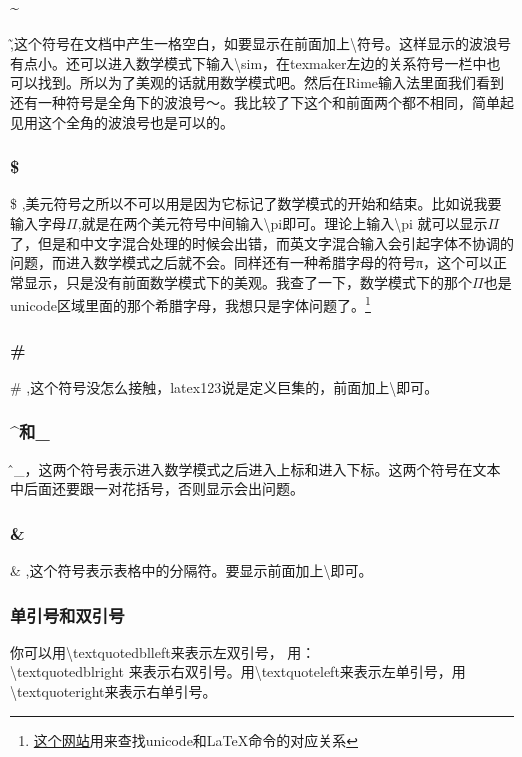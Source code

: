 \documentclass[11pt,oneside]{book}
\begin{document}
\begin{common-format}
\subsubsection{\~{}}
\~ ,这个符号在文档中产生一格空白，如要显示在前面加上\textbackslash 符号。这样显示的波浪号有点小。还可以进入数学模式下输入\textbackslash sim，在texmaker左边的关系符号一栏中也可以找到。所以为了美观的话就用数学模式吧。然后在Rime输入法里面我们看到还有一种符号是全角下的波浪号～。我比较了下这个和前面两个都不相同，简单起见用这个全角的波浪号也是可以的。

\subsubsection{\$}
\$ ,美元符号之所以不可以用是因为它标记了数学模式的开始和结束。比如说我要输入字母$\Pi$,就是在两个美元符号中间输入\textbackslash pi即可。理论上输入\textbackslash pi 就可以显示$\Pi$了，但是和中文字混合处理的时候会出错，而英文字混合输入会引起字体不协调的问题，而进入数学模式之后就不会。同样还有一种希腊字母的符号π，这个可以正常显示，只是没有前面数学模式下的美观。我查了一下，数学模式下的那个$\Pi$也是unicode区域里面的那个希腊字母，我想只是字体问题了。\footnote{\href{http://www.johndcook.com/unicode_latex.html}{这个网站}用来查找unicode和\LaTeX 命令的对应关系}

\subsubsection{\#}
\# ,这个符号没怎么接触，latex123说是定义巨集的，前面加上\textbackslash 即可。

\subsubsection{\^{}和\_{}}
\^和\_{}，这两个符号表示进入数学模式之后进入上标和进入下标。这两个符号在文本中后面还要跟一对花括号，否则显示会出问题。

\subsubsection{\&}
\& ,这个符号表示表格中的分隔符。要显示前面加上\textbackslash 即可。

\subsubsection{单引号和双引号}
你可以用\textbackslash textquotedblleft来表示左双引号， 用：\\
\textbackslash textquotedblright 来表示右双引号。用\textbackslash textquoteleft来表示左单引号，用\textbackslash textquoteright来表示右单引号。


\end{common-format}
\end{document}
